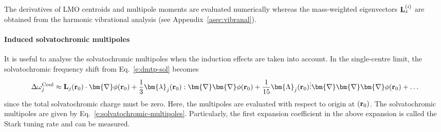 \documentclass[a4paper,titlepage,twoside,fleqn,12pt]{book}
\newcommand{\BM}[1]{\bm{#1}}
\begin{document}
\begin{refsection}
The derivatives of LMO centroids and multipole moments are evaluated numerically whereas 
the mass\hyp{}weighted eigenvectors
${\bf L}_x^{(i)}$ 
are obtained from the harmonic vibrational analysis (see Appendix~\ref{asec:vibranal}).

\paragraph{Induced solvatochromic multipoles\label{p:solindmult}}
It is useful to analyse the solvatochromic multipoles 
when the induction effects are taken into account.
In the single\hyp{}centre limit, the solvatochromic
frequency shift from Eq.~\eqref{e:dmtp-sol}
becomes
%
\begin{equation} \label{e:dmtp-solmmm}
 \Delta\omega_j^{\rm Coul} \approx  
                        {\bf L}_j({\bf r}_0) \cdot {\BM \nabla} \phi({\bf r}_0)   + 
      \frac{1}{3} {\BM \lambda}_j({\bf r}_0) : {\BM \nabla}  {\BM \nabla} \phi({\bf r}_0)   + 
     \frac{1}{15} {\BM \Lambda}_j({\bf r}_0) \vdots {\BM \nabla}  {\BM \nabla}  {\BM \nabla} \phi({\bf r}_0) + \ldots
\end{equation}
%
since the total solvatochromic charge must be zero. Here, the multipoles
are evaluated with respect to origin at $({\bf r}_0)$.
The solvatochromic multipoles are given by Eq.~\eqref{e:solvatochromic-multipoles}.
Particularly, the first expansion coefficient in the above expansion
is called the Stark tuning rate and can be measured.


\end{refsection}
\end{document}
